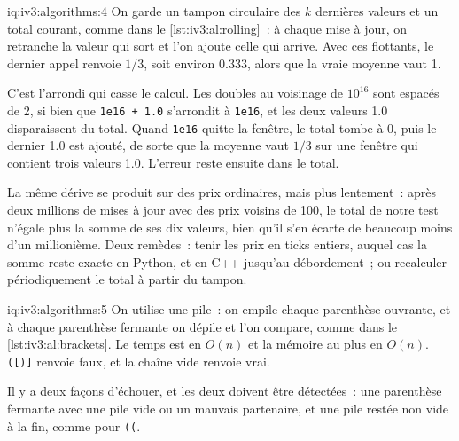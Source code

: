 \begin{solution}{iq:iv3:algorithms:4}
On garde un tampon circulaire des $k$ dernières valeurs et un total courant, comme dans le \cref{lst:iv3:al:rolling}~: à chaque mise à jour, on retranche la valeur qui sort et l'on ajoute celle qui arrive. Avec ces flottants, le dernier appel renvoie $1/3$, soit environ 0.333, alors que la vraie moyenne vaut 1.
\label{lst:iv3:al:rolling}

C'est l'arrondi qui casse le calcul. Les doubles au voisinage de $10^{16}$ sont espacés de 2, si bien que \texttt{1e16 + 1.0} s'arrondit à \texttt{1e16}, et les deux valeurs 1.0 disparaissent du total. Quand \texttt{1e16} quitte la fenêtre, le total tombe à 0, puis le dernier 1.0 est ajouté, de sorte que la moyenne vaut $1/3$ sur une fenêtre qui contient trois valeurs 1.0. L'erreur reste ensuite dans le total.

La même dérive se produit sur des prix ordinaires, mais plus lentement~: après deux millions de mises à jour avec des prix voisins de 100, le total de notre test n'égale plus la somme de ses dix valeurs, bien qu'il s'en écarte de beaucoup moins d'un millionième. Deux remèdes~: tenir les prix en ticks entiers, auquel cas la somme reste exacte en Python, et en C++ jusqu'au débordement~; ou recalculer périodiquement le total à partir du tampon.

\end{solution}

\begin{solution}{iq:iv3:algorithms:5}
On utilise une pile~: on empile chaque parenthèse ouvrante, et à chaque parenthèse fermante on dépile et l'on compare, comme dans le \cref{lst:iv3:al:brackets}. Le temps est en $O(n)$ et la mémoire au plus en $O(n)$. \texttt{([)]} renvoie faux, et la chaîne vide renvoie vrai.
\label{lst:iv3:al:brackets}

Il y a deux façons d'échouer, et les deux doivent être détectées~: une parenthèse fermante avec une pile vide ou un mauvais partenaire, et une pile restée non vide à la fin, comme pour \texttt{((}.

\end{solution}

